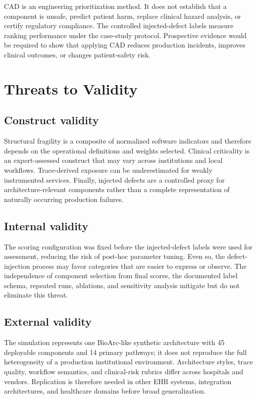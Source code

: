 \documentclass[english,preprint]{elsarticle}
\newcommand{\CAD}{\textsc{CAD}\xspace}
\begin{document}
\CAD is an engineering prioritization method. It does not establish that a component is unsafe, predict patient harm, replace clinical hazard analysis, or certify regulatory compliance. The controlled injected-defect labels measure ranking performance under the case-study protocol. Prospective evidence would be required to show that applying \CAD reduces production incidents, improves clinical outcomes, or changes patient-safety risk.

\section{Threats to Validity}\label{sec:threats}

\subsection{Construct validity}

Structural fragility is a composite of normalized software indicators and therefore depends on the operational definitions and weights selected. Clinical criticality is an expert-assessed construct that may vary across institutions and local workflows. Trace-derived exposure can be underestimated for weakly instrumented services. Finally, injected defects are a controlled proxy for architecture-relevant components rather than a complete representation of naturally occurring production failures.

\subsection{Internal validity}

The scoring configuration was fixed before the injected-defect labels were used for assessment, reducing the risk of post-hoc parameter tuning. Even so, the defect-injection process may favor categories that are easier to express or observe. The independence of component selection from final scores, the documented label schema, repeated runs, ablations, and sensitivity analysis mitigate but do not eliminate this threat.

\subsection{External validity}

The simulation represents one BioArc-like synthetic architecture with 45 deployable components and 14 primary pathways; it does not reproduce the full heterogeneity of a production institutional environment. Architecture styles, trace quality, workflow semantics, and clinical-risk rubrics differ across hospitals and vendors. Replication is therefore needed in other EHR systems, integration architectures, and healthcare domains before broad generalization.
\end{document}

